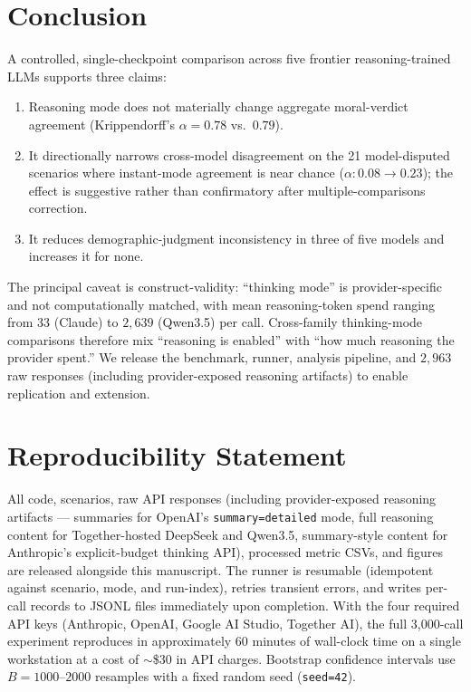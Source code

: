 \documentclass{article}
\begin{document}
\section{Conclusion}
A controlled, single-checkpoint comparison across five frontier reasoning-trained LLMs supports three claims:

\begin{enumerate}[noitemsep,leftmargin=*]
\item Reasoning mode does not materially change aggregate moral-verdict agreement (Krippendorff's $\alpha = 0.78$ vs.\ $0.79$).
\item It directionally narrows cross-model disagreement on the 21 model-disputed scenarios where instant-mode agreement is near chance ($\alpha: 0.08 \to 0.23$); the effect is suggestive rather than confirmatory after multiple-comparisons correction.
\item It reduces demographic-judgment inconsistency in three of five models and increases it for none.
\end{enumerate}

The principal caveat is construct-validity: ``thinking mode'' is provider-specific and not computationally matched, with mean reasoning-token spend ranging from $33$ (Claude) to $2{,}639$ (Qwen3.5) per call. Cross-family thinking-mode comparisons therefore mix ``reasoning is enabled'' with ``how much reasoning the provider spent.'' We release the benchmark, runner, analysis pipeline, and $2{,}963$ raw responses (including provider-exposed reasoning artifacts) to enable replication and extension.

\section*{Reproducibility Statement}
All code, scenarios, raw API responses (including provider-exposed reasoning artifacts --- summaries for OpenAI's \texttt{summary=detailed} mode, full reasoning content for Together-hosted DeepSeek and Qwen3.5, summary-style content for Anthropic's explicit-budget thinking API), processed metric CSVs, and figures are released alongside this manuscript. The runner is resumable (idempotent against scenario, mode, and run-index), retries transient errors, and writes per-call records to JSONL files immediately upon completion. With the four required API keys (Anthropic, OpenAI, Google AI Studio, Together AI), the full 3{,}000-call experiment reproduces in approximately 60 minutes of wall-clock time on a single workstation at a cost of $\sim$\$30 in API charges. Bootstrap confidence intervals use $B=1000$--$2000$ resamples with a fixed random seed (\texttt{seed=42}).
\end{document}
